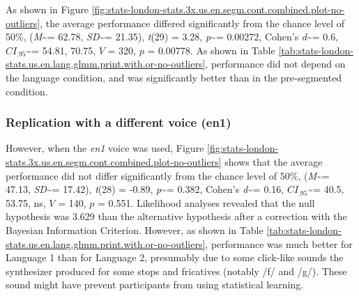 \documentclass[
]{article}
\newcommand{\T}{{\em t\/}}
\newcommand{\p}{{\em p\/}}
\newcommand{\M}{{\em M\/}}
\newcommand{\SD}{{\em SD\/}}
\newcommand{\D}{Cohen's {\em d\/}}
\newcommand{\CI}{$CI_{.95}$}
\begin{document}
As shown in Figure
\ref{fig:stats-london-stats.3x.us.en.segm.cont.combined.plot-no-outliers},
the average performance differed significantly from the chance level of
50\%, (\M\textasciitilde= 62.78, \SD\textasciitilde= 21.35), \T(29) =
3.28, \p\textasciitilde= 0.00272, \D\textasciitilde= 0.6,
\CI\textasciitilde= 54.81, 70.75, \(V\) = 320, \(p\) = 0.00778. As shown
in Table
\ref{tab:stats-london-stats.us.en.lang.glmm.print.with.or-no-outliers},
performance did not depend on the language condition, and was
significantly better than in the pre-segmented condition.

\subsubsection{Replication with a different voice
(en1)}\label{replication-with-a-different-voice-en1}

However, when the \emph{en1} voice was used, Figure
\ref{fig:stats-london-stats.3x.us.en.segm.cont.combined.plot-no-outliers}
shows that the average performance did not differ significantly from the
chance level of 50\%, (\M\textasciitilde= 47.13, \SD\textasciitilde=
17.42), \T(28) = -0.89, \p\textasciitilde= 0.382, \D\textasciitilde=
0.16, \CI\textasciitilde= 40.5, 53.75, ns, \(V\) = 140, \(p\) = 0.551.
Likelihood analyses revealed that the null hypothesis was 3.629 than the
alternative hypothesis after a correction with the Bayesian Information
Criterion. However, as shown in Table
\ref{tab:stats-london-stats.us.en.lang.glmm.print.with.or-no-outliers},
performance was much better for Language 1 than for Language 2,
presumably due to some click-like sounds the synthesizer produced for
some stops and fricatives (notably /f/ and /g/). These sound might have
prevent participants from using statistical learning.
\end{document}
